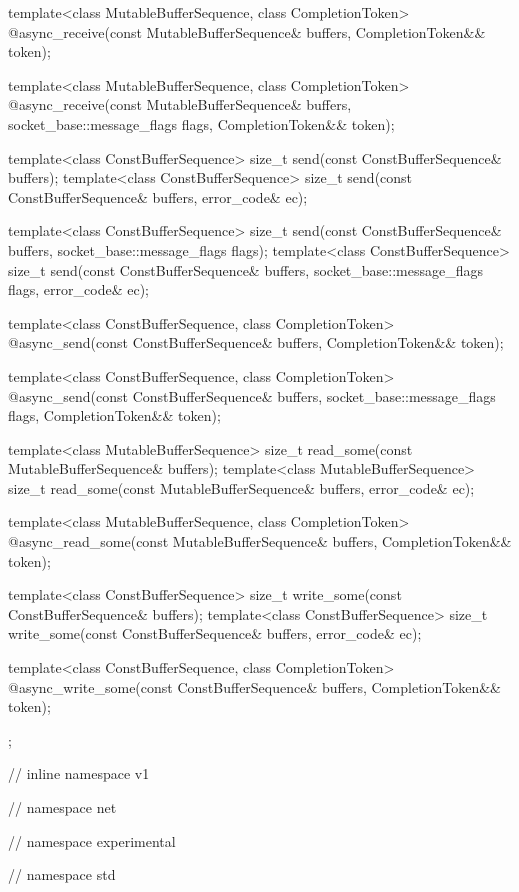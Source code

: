 \begin{codeblock}
{{{{{    template<class MutableBufferSequence, class CompletionToken>
      @\DEDUCED@ async_receive(const MutableBufferSequence& buffers,
                            CompletionToken&& token);

    template<class MutableBufferSequence, class CompletionToken>
      @\DEDUCED@ async_receive(const MutableBufferSequence& buffers,
                            socket_base::message_flags flags,
                            CompletionToken&& token);

    template<class ConstBufferSequence>
      size_t send(const ConstBufferSequence& buffers);
    template<class ConstBufferSequence>
      size_t send(const ConstBufferSequence& buffers, error_code& ec);

    template<class ConstBufferSequence>
      size_t send(const ConstBufferSequence& buffers,
                  socket_base::message_flags flags);
    template<class ConstBufferSequence>
      size_t send(const ConstBufferSequence& buffers,
                  socket_base::message_flags flags, error_code& ec);

    template<class ConstBufferSequence, class CompletionToken>
      @\DEDUCED@ async_send(const ConstBufferSequence& buffers,
                         CompletionToken&& token);

    template<class ConstBufferSequence, class CompletionToken>
      @\DEDUCED@ async_send(const ConstBufferSequence& buffers,
                         socket_base::message_flags flags,
                         CompletionToken&& token);

    template<class MutableBufferSequence>
      size_t read_some(const MutableBufferSequence& buffers);
    template<class MutableBufferSequence>
      size_t read_some(const MutableBufferSequence& buffers,
                       error_code& ec);

    template<class MutableBufferSequence, class CompletionToken>
      @\DEDUCED@ async_read_some(const MutableBufferSequence& buffers,
                              CompletionToken&& token);

    template<class ConstBufferSequence>
      size_t write_some(const ConstBufferSequence& buffers);
    template<class ConstBufferSequence>
      size_t write_some(const ConstBufferSequence& buffers,
                        error_code& ec);

    template<class ConstBufferSequence, class CompletionToken>
      @\DEDUCED@ async_write_some(const ConstBufferSequence& buffers,
                               CompletionToken&& token);
  };

} // inline namespace v1
} // namespace net
} // namespace experimental
} // namespace std
\end{codeblock}

